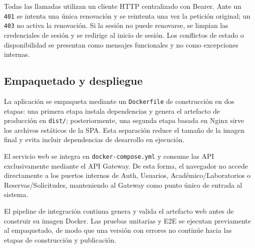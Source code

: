 Todas las llamadas utilizan un cliente HTTP centralizado con Bearer. Ante
un \texttt{401} se intenta una única renovación y se reintenta una vez la
petición original; un \texttt{403} no activa la renovación. Si la sesión
no puede renovarse, se limpian las credenciales de sesión y se redirige al
inicio de sesión. Los conflictos de estado o disponibilidad se presentan
como mensajes funcionales y no como excepciones internas.

\subsection{Empaquetado y despliegue}

La aplicación se empaqueta mediante un \texttt{Dockerfile} de
construcción en dos etapas: una primera etapa instala dependencias y
genera el artefacto de producción en \texttt{dist/}; posteriormente, una segunda etapa basada
en Nginx sirve los archivos estáticos de la SPA. Esta separación reduce
el tamaño de la imagen final y evita incluir dependencias de desarrollo
en ejecución.

El servicio web se integra en \texttt{docker-compose.yml} y consume las
API exclusivamente mediante el API Gateway. De esta forma, el navegador
no accede directamente a los puertos internos de Auth, Usuarios,
Académico/Laboratorios o Reservas/Solicitudes, manteniendo al Gateway
como punto único de entrada al sistema.

El pipeline de integración continua genera y valida el artefacto web
antes de construir su imagen Docker. Las pruebas unitarias y E2E se
ejecutan previamente al empaquetado, de modo que una versión con errores
no continúe hacia las etapas de construcción y publicación.
